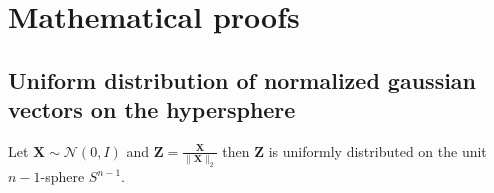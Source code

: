 \chapter{Mathematical proofs}

\section{Uniform distribution of normalized gaussian vectors on the hypersphere}

\begin{theorem}
     Let $\boldsymbol{X} \sim \mathcal{N}(0,I)$
and $\boldsymbol{Z} = \frac{\boldsymbol{X}}{\|\boldsymbol{X}\|_2}$ then $\boldsymbol{Z}$ is uniformly distributed on the unit $n-1$-sphere $S^{n-1}$.

\end{theorem}